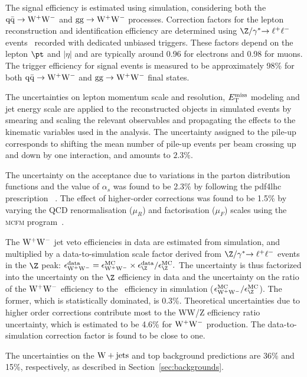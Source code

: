 
The signal efficiency is estimated using simulation, considering both 
the $\rm{q}\bar{\rm{q}}\to\mathrm{W}^+\mathrm{W}^-$ and $\mathrm{gg} \to \mathrm{W}^+\mathrm{W}^-$ processes. 
Correction factors for the lepton reconstruction and identification
efficiency are determined using $\dyll$ events~\cite{wzxs} recorded with
dedicated unbiased triggers.
These factors depend on the lepton $\pt$ 
and $|\eta|$ and are typically around 0.96 for electrons and 0.98 for muons.
The trigger efficiency for signal events is measured to be approximately 98\%
for both $\rm{q}\bar{\rm{q}}\to\mathrm{W}^+\mathrm{W}^-$ and $\mathrm{gg} \to \mathrm{W}^+\mathrm{W}^-$ final states.

The uncertainties on lepton momentum scale and resolution, 
$E_\mathrm{T}^{\mathrm{miss}}$ modeling and jet energy scale are applied to the reconstructed objects in 
simulated events by smearing and scaling the relevant observables and propagating 
the effects to the kinematic variables used in the analysis. 
The uncertainty assigned to the pile-up corresponds to shifting the mean number
of pile-up events per beam crossing up and down by one interaction, and amounts to $2.3\%$.

The uncertainty on the acceptance due to variations in the parton distribution functions and the
value of $\alpha_{s}$ was found to be 2.3\% by following the {\sc pdf4lhc} prescription
~\cite{PDF4LHC,LHCHiggsCrossSectionWorkingGroup:2011ti}. 
The effect of higher-order corrections was found to be 1.5\% by varying the QCD renormalisation 
($\mu_R$) and factorisation ($\mu_F$) scales using the \textsc{mcfm} program~\cite{MCFM}.

The $\mathrm{W}^+\mathrm{W}^-$ jet veto efficiencies in data are estimated from simulation, and multiplied by a 
data-to-simulation scale factor derived from $\dyll$ events in the $\Z$ peak: 
$\epsilon_{\WW}^{\rm data} = \epsilon_{\WW}^{\rm MC} \times \epsilon_{\Z}^{\rm data}/\epsilon_{\Z}^{\rm MC}.$
The uncertainty is thus factorized into the uncertainty on the $\Z$ efficiency in data and the
uncertainty on the ratio of the $\mathrm{W}^+\mathrm{W}^-$ efficiency to the \Z\ efficiency in simulation
($\epsilon_{\WW}^{\rm MC}/\epsilon_{\Z}^{\rm MC}$). The former, which is statistically dominated, 
is 0.3\%. Theoretical uncertainties due to higher order corrections contribute most to the 
WW/Z efficiency ratio uncertainty, which is estimated to be 4.6\% for $\mathrm{W}^+\mathrm{W}^-$ production. The 
data-to-simulation correction factor is found to be close to one.

The uncertainties on the $\mathrm{W+jets}$ and top background predictions 
are 36\% and 15\%, respectively, as described in Section~\ref{sec:backgrounds}. 

